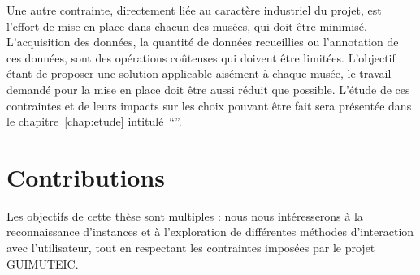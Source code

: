 Une autre contrainte, directement liée au caractère industriel du projet, est l'effort de mise en place dans chacun des musées, qui doit être minimisé.
L'acquisition des données, la quantité de données recueillies ou l'annotation de ces données, sont des opérations coûteuses qui doivent être limitées.
L'objectif étant de proposer une solution applicable aisément à chaque musée, le travail demandé pour la mise en place doit être aussi réduit que possible.
L'étude de ces contraintes et de leurs impacts sur les choix pouvant être fait sera présentée dans le chapitre~\ref{chap:etude} intitulé~``''.




\section{Contributions}

Les objectifs de cette thèse sont multiples : nous nous intéresserons à la reconnaissance d'instances et à l'exploration de différentes méthodes d'interaction avec l'utilisateur, tout en respectant les contraintes imposées par le projet GUIMUTEIC.


